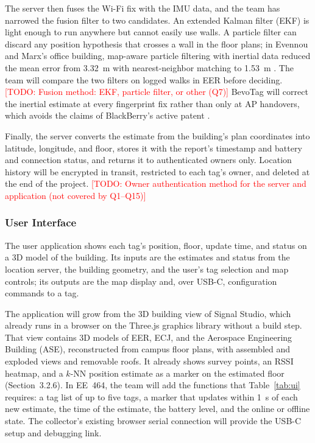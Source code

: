 \documentclass[12pt,letterpaper]{article}
\newcommand{\TODO}[1]{\textcolor{red}{[TODO: #1]}}
\begin{document}
The server then fuses the Wi-Fi fix with the IMU data, and the team has narrowed the fusion filter to
two candidates. An extended Kalman filter (EKF) \cite{welch} is light enough to run anywhere but
cannot easily use walls. A particle filter can discard any position hypothesis that crosses a wall in
the floor plans; in Evennou and Marx's office building, map-aware particle filtering with inertial
data reduced the mean error from 3.32~m with nearest-neighbor matching to 1.53~m \cite{evennou}. The
team will compare the two filters on logged walks in EER before deciding. \TODO{Fusion method:
EKF, particle filter, or other (Q7)} BevoTag will correct the inertial estimate at every fingerprint
fix rather than only at AP handovers, which avoids the claims of BlackBerry's active patent
\cite{blackberry}.

Finally, the server converts the estimate from the building's plan coordinates into latitude,
longitude, and floor, stores it with the report's timestamp and battery and connection status, and
returns it to authenticated owners only. Location history will be encrypted in transit, restricted
to each tag's owner, and deleted at the end of the project. \TODO{Owner authentication method for
the server and application (not covered by Q1--Q15)}

\subsubsection{User Interface}
The user application shows each tag's position, floor, update time, and status on a 3D model of the
building. Its inputs are the estimates and status from the location server, the building geometry,
and the user's tag selection and map controls; its outputs are the map display and, over USB-C,
configuration commands to a tag.

The application will grow from the 3D building view of Signal Studio, which already runs in a browser
on the Three.js graphics library without a build step. That view contains 3D models of EER, ECJ, and
the Aerospace Engineering Building (ASE), reconstructed from campus floor plans, with assembled and
exploded views and removable roofs. It already shows survey points, an RSSI heatmap, and a $k$-NN
position estimate as a marker on the estimated floor (Section~3.2.6). In EE~464, the team will add
the functions that Table~\ref{tab:ui} requires: a tag list of up to five tags, a marker that updates
within 1~s of each new estimate, the time of the estimate, the battery level, and the online or
offline state. The collector's existing browser serial connection will provide the USB-C setup and
debugging link.
\end{document}
